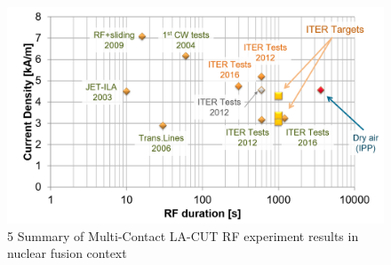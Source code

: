{\begin{figure}[h]
	\centering
	\includegraphics[width=1.0\linewidth]{figures/chap3/RF_contacts/RF_contact_summary_experiments}
	\caption{5 Summary of Multi-Contact LA-CUT RF experiment results in nuclear fusion context}
	\label{fig:rfcontactsummaryexperiments}
\end{figure}

}
